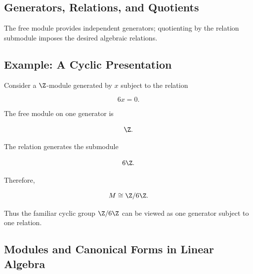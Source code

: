 \subsection{Generators, Relations, and Quotients}
\label{subsec:generators-relations-visual}

\begin{center}
\end{center}

The free module provides independent generators; quotienting by the relation
submodule imposes the desired algebraic relations.

\subsection{Example: A Cyclic Presentation}
\label{subsec:cyclic-presentation-example}

Consider a \(\Z\)-module generated by \(x\) subject to the relation

\[ 6x=0. \]

The free module on one generator is

\[ \Z. \]

The relation generates the submodule

\[ 6\Z. \]

Therefore,

\[ M\cong\Z/6\Z. \]

Thus the familiar cyclic group \(\Z/6\Z\) can be viewed as one generator
subject to one relation.

\subsection{Modules and Canonical Forms in Linear Algebra}
\label{subsec:modules-canonical-linear-algebra}

